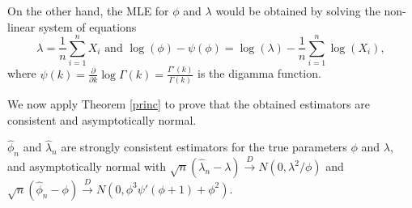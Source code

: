 \documentclass[lineno]{biometrika}
\begin{document}
On the other hand, the MLE for $\phi$ and $\lambda$ would be obtained by solving the non-linear system of equations
\begin{equation}\label{verogg23}
\lambda=\frac{1}{n}\sum_{i=1}^n X_i\mbox{ and }\log(\phi)-\psi(\phi)=\log(\lambda)-\frac{1}{n}\sum_{i=1}^n{\log\left(X_i\right)}, 
 \end{equation}
where $\psi(k)=\frac{\partial}{\partial k}\log\Gamma(k)=\frac{\Gamma'(k)}{\Gamma(k)}$ is the digamma function.

We now apply Theorem \ref{princ} to prove that the obtained estimators are consistent and asymptotically normal.

\begin{proposition}\label{proofgamma} $\hat\phi_n$ and $\hat\lambda_n$ are strongly consistent estimators for the true parameters $\phi$ and $\lambda$, and asymptotically normal with $\sqrt{n}\left(\hat{\lambda}_n-\lambda\right)\overset{D}{\to} N\left(0,\lambda^2/\phi\right)$ and $\sqrt{n}\left(\hat{\phi}_n-\phi\right)\overset{D}{\to} N\left(0,\phi^3\psi'(\phi+1)+\phi^2\right)$.
\end{proposition}
\end{document}
